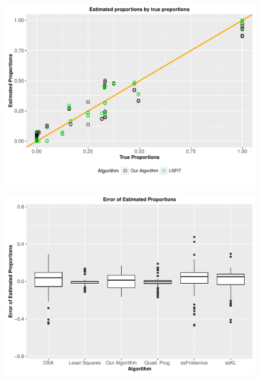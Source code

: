 \documentclass[reqno,12pt,oneside]{report}\usepackage[]{graphicx}\usepackage[]{color}
\makeatletter
\def\maxwidth{ %
  \ifdim\Gin@nat@width>\linewidth
    \linewidth
  \else
    \Gin@nat@width
  \fi
}
\newenvironment{knitrout}{}{} %
\renewenvironment{knitrout}{\begin{small}}{\end{small}}
\theoremstyle{plain}
\theoremstyle{definition}
\theoremstyle{remark}
\numberwithin{theorem}{chapter}     %
\makeatother
\begin{document}
\begin{figure}
  \centering
\begin{knitrout}
\color{fgcolor}
\includegraphics[width=\maxwidth]{figure/plot3-1} 

\end{knitrout}
\end{figure}

\begin{figure}
  \centering
\begin{knitrout}
\color{fgcolor}
\includegraphics[width=\maxwidth]{figure/plot4-1} 

\end{knitrout}
\end{figure}
\end{document}
